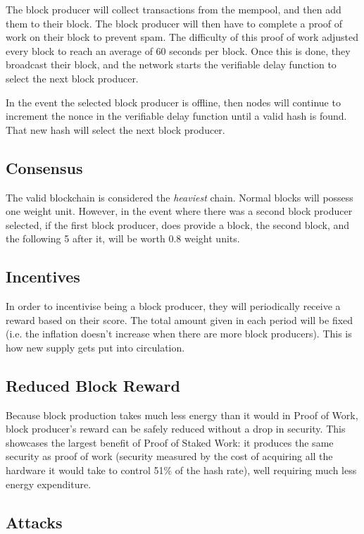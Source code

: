 \documentclass[12pt, letterpaper]{article}
\begin{document}
The block producer will collect transactions from the mempool, and then add them
to their block. The block producer will then have to complete a proof of work on
their block to prevent spam. The difficulty of this proof of work adjusted every
block to reach an average of 60 seconds per block. Once this is done, they
broadcast their block, and the network starts the verifiable delay function to
select the next block producer.

In the event the selected block producer is offline, then nodes will continue to
increment the nonce in the verifiable delay function until a valid hash is
found. That new hash will select the next block producer.

\subsection{Consensus}
The valid blockchain is considered the \textit{heaviest} chain. Normal blocks
will possess one weight unit. However, in the event where there was a second
block producer selected, if the first block producer, does provide a block, the
second block, and the following 5 after it, will be worth 0.8 weight units.

\subsection{Incentives}
In order to incentivise being a block producer, they will periodically receive a
reward based on their score. The total amount given in each period will be fixed
(i.e. the inflation doesn't increase when there are more block producers). This
is how new supply gets put into circulation.

\subsection{Reduced Block Reward}
Because block production takes much less energy than it would in Proof of Work,
block producer's reward can be safely reduced without a drop in security. This
showcases the largest benefit of Proof of Staked Work: it produces the same
security as proof of work (security measured by the cost of acquiring all the
hardware it would take to control 51\% of the hash rate), well requiring much
less energy expenditure.

\subsection{Attacks}
\end{document}
